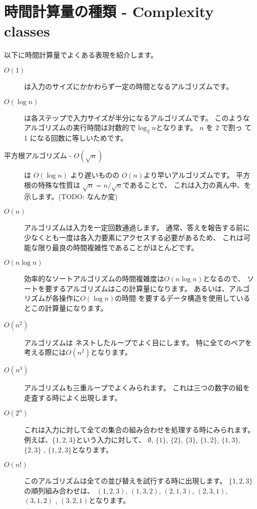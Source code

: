 \section{時間計算量の種類 - Complexity classes}


以下に時間計算量でよくある表現を紹介します。

\begin{description}
\item[$O(1)$]
 は入力のサイズにかかわらず一定の時間となるアルゴリズムです。

\item[$O(\log n)$]
 は各ステップで入力サイズが半分になるアルゴリズムです。
このようなアルゴリズムの実行時間は対数的で$\log_2 n$となります。
$n$ を $2$ で割っ て 1 になる回数に等しいためです。

\item[平方根アルゴリズム - $O(\sqrt n)$]
 は
$O(\log n)$ より遅いものの $O(n)$より早いアルゴリズムです。
平方根の特殊な性質は
$\sqrt n = n/\sqrt n$であることで、
これは入力の真ん中、を示します。(TODO: なんか変)

\item[$O(n)$]
アルゴリズムは入力を一定回数通過します。
通常、答えを報告する前に少なくとも一度は各入力要素にアクセスする必要があるため、
これは可能な限り最良の時間複雑性であることがほとんどです。

\item[$O(n \log n)$]
効率的なソートアルゴリズムの時間複雑度は$O(n \log n)$となるので、
ソートを要するアルゴリズムはこの計算量になります。
あるいは、アルゴリズムが各操作に$O( \log n)$の時間
を要するデータ構造を使用しているとこの計算量になります。

\item[$O(n^2)$]
 アルゴリズムは
ネストしたループでよく目にします。
特に全てのペアを考える際には$O(n^2)$となります。

\item[$O(n^3)$]
アルゴリズムも三重ループでよくみられます。
これは三つの数字の組を走査する時によく出現します。

\item[$O(2^n)$]
これは入力に対して全ての集合の組み合わせを処理する時にみられます。
例えば、$\{1,2,3\}$という入力に対して、
$\emptyset$, $\{1\}$, $\{2\}$, $\{3\}$, $\{1,2\}$,
$\{1,3\}$, $\{2,3\}$ , $\{1,2,3\}$となります。

\item[$O(n!)$]
このアルゴリズムは全ての並び替えを試行する時に出現します。
$\{1,2,3\}$ の順列組み合わせは、
$(1,2,3)$, $(1,3,2)$, $(2,1,3)$, $(2,3,1)$,
$(3,1,2)$ , $(3,2,1)$となります。

\end{description}

